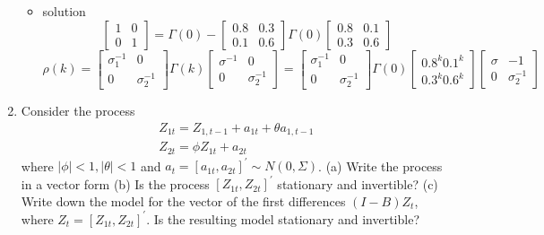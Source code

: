 \documentclass{article}
\begin{document}
\begin{enumerate}
\begin{itemize}
		\item solution
		\begin{equation*}
		\left[ \begin{array}{ll}{1} & {0} \\ {0} & {1}\end{array}\right]=\Gamma(0) - \left[ \begin{array}{ll}{0.8} & {0.3} \\ {0.1} & {0.6}\end{array}\right] \Gamma(0) \left[ \begin{array}{ll}{0.8} & {0.1} \\ {0.3} & {0.6}\end{array}\right]
		\end{equation*}
		\begin{equation*}
		\rho(k)=\left[ \begin{array}{cc}{\sigma_{1}^{-1}} & {0} \\ {0} & {\sigma_{2}^{-1}}\end{array}\right]\Gamma(k) \left[ \begin{array}{cc}{\sigma^{-1}} & {0} \\ {0} & {\sigma_{2}^{-1}}\end{array}\right]=\left[ \begin{array}{cc}{\sigma_{1}^{-1}} & {0} \\ {0} & {\sigma_{2}^{-1}}\end{array}\right]\Gamma(0)\left[ \begin{array}{l}{0.8^{k} 0.1^{k}} \\ {0.3^{k} 0.6^{k}}\end{array}\right]\left[ \begin{array}{ll}{\sigma} & {-1} \\ {0} & {\sigma_{2}^{-1}}\end{array}\right]
		\end{equation*}
	\end{itemize}
	
	\item Consider the process
	\begin{equation*}
	\begin{array}{l}{Z_{1 t}=Z_{1, t-1}+a_{1 t}+\theta a_{1, t-1}} \\ {Z_{2 t}=\phi Z_{1 t}+a_{2 t}}\end{array}
	\end{equation*}
	where $|\phi|<1,|\theta|<1$ and $a_{t}=\left[a_{1 t}, a_{2 t}\right]^{\prime} \sim N(0, \Sigma)$.
	(a) Write the process in a vector form
	(b) Is the process $\left[Z_{1 t}, Z_{2 t}\right]^{\prime}$ stationary and invertible?
	(c) Write down the model for the vector of the first differences $(I-B) Z_{t}$, where $Z_{t}=\left[Z_{1 t}, Z_{2 t}\right]^{\prime}$. Is the resulting model stationary and invertible?
	

\end{enumerate}
\end{document}

